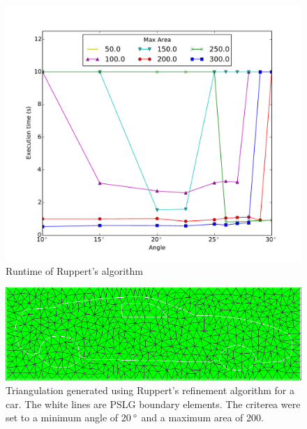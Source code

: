 \begin{figure}[ht]
    \centering
    \includegraphics[width=\columnwidth]{../images/ruppert.pdf}
    \caption{Runtime of Ruppert's algorithm}
    \label{fig:ruppert-runtime}
\end{figure}

\begin{figure}[ht]
    \centering
    \includegraphics[width=\columnwidth]{../images/Car_Ruppert20.png}
    \caption{Triangulation generated using Ruppert's refinement algorithm for a car. The white lines are PSLG boundary elements.
    The criterea were set to a minimum angle of 20$\,^{\circ}$ and a maximum area of 200.}
    \label{fig:result_Car20}
\end{figure}

